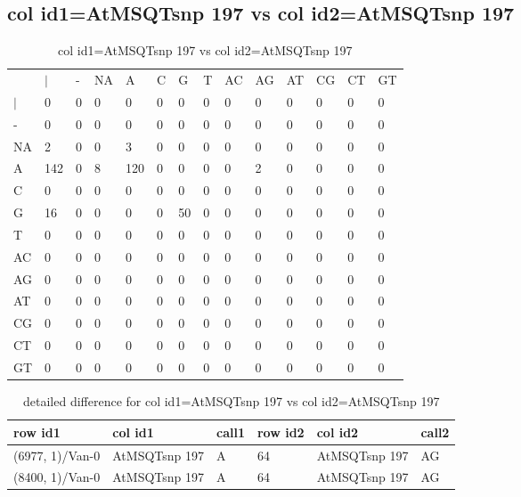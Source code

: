 \subsection{col id1=AtMSQTsnp 197 vs col id2=AtMSQTsnp 197}
\begin{center}
\begin{longtable}{|l|l|l|l|l|l|l|l|l|l|l|l|l|l|}
\caption{col id1=AtMSQTsnp 197 vs col id2=AtMSQTsnp 197} \label{table_dm768}\\
\hline
\\
\hline
&$|$&-&NA&A&C&G&T&AC&AG&AT&CG&CT&GT\\
$|$&0&0&0&0&0&0&0&0&0&0&0&0&0\\
-&0&0&0&0&0&0&0&0&0&0&0&0&0\\
NA&2&0&0&3&0&0&0&0&0&0&0&0&0\\
A&142&0&8&120&0&0&0&0&2&0&0&0&0\\
C&0&0&0&0&0&0&0&0&0&0&0&0&0\\
G&16&0&0&0&0&50&0&0&0&0&0&0&0\\
T&0&0&0&0&0&0&0&0&0&0&0&0&0\\
AC&0&0&0&0&0&0&0&0&0&0&0&0&0\\
AG&0&0&0&0&0&0&0&0&0&0&0&0&0\\
AT&0&0&0&0&0&0&0&0&0&0&0&0&0\\
CG&0&0&0&0&0&0&0&0&0&0&0&0&0\\
CT&0&0&0&0&0&0&0&0&0&0&0&0&0\\
GT&0&0&0&0&0&0&0&0&0&0&0&0&0\\
\hline
\end{longtable}
\end{center}

\begin{center}
\begin{longtable}{|l|l|l|l|l|l|}
\caption{detailed difference for col id1=AtMSQTsnp 197 vs col id2=AtMSQTsnp 197} \label{table_dm769}\\
\hline
row id1&col id1&call1&row id2&col id2&call2\\
\hline
(6977, 1)/Van-0&AtMSQTsnp 197&A&64&AtMSQTsnp 197&AG\\
(8400, 1)/Van-0&AtMSQTsnp 197&A&64&AtMSQTsnp 197&AG\\
\hline
\end{longtable}
\end{center}

